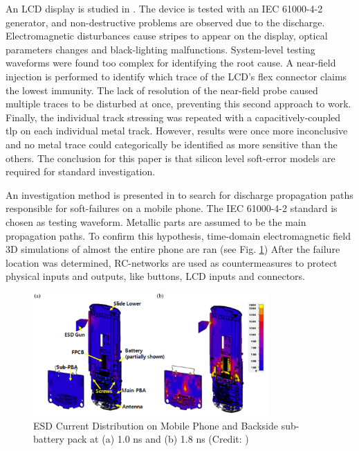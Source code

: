 An LCD display is studied in \cite{softFailLCD}.
The device is tested with an IEC 61000-4-2 \cite{iec61000-4-2} generator, and non-destructive problems are observed due to the discharge.
Electromagnetic disturbances cause stripes to appear on the display, optical parameters changes and black-lighting malfunctions.
System-level testing waveforms were found too complex for identifying the root cause.
A near-field injection is performed to identify which trace of the LCD's flex connector claims the lowest immunity.
The lack of resolution of the near-field probe caused multiple traces to be disturbed at once, preventing this second approach to work.
Finally, the individual track stressing was repeated with a capacitively-coupled \gls{tlp} on each individual metal track.
However, results were once more inconclusive and no metal trace could categorically be identified as more sensitive than the others.
The conclusion for this paper is that silicon level soft-error models are required for standard investigation.

An investigation method is presented in \cite{softFailMobile} to search for discharge propagation paths responsible for soft-failures on a mobile phone.
The IEC 61000-4-2 standard is chosen as testing waveform.
Metallic parts are assumed to be the main propagation paths.
To confirm this hypothesis, time-domain electromagnetic field 3D simulations of almost the entire phone are ran (see Fig. \ref{fig:mobile-phone-3d-em})
After the failure location was determined, RC-networks are used as countermeasures to protect physical inputs and outputs, like buttons, LCD inputs and connectors.

\begin{figure}[!h]
  \centering
  \includegraphics[width=0.8\textwidth]{src/1/figures/current_distribution_mobile.png}
  \caption{ESD Current Distribution on Mobile Phone and Backside sub-battery pack at (a) 1.0 ns and (b) 1.8 ns (Credit: \cite{softFailMobile})}
  \label{fig:mobile-phone-3d-em}
\end{figure}

